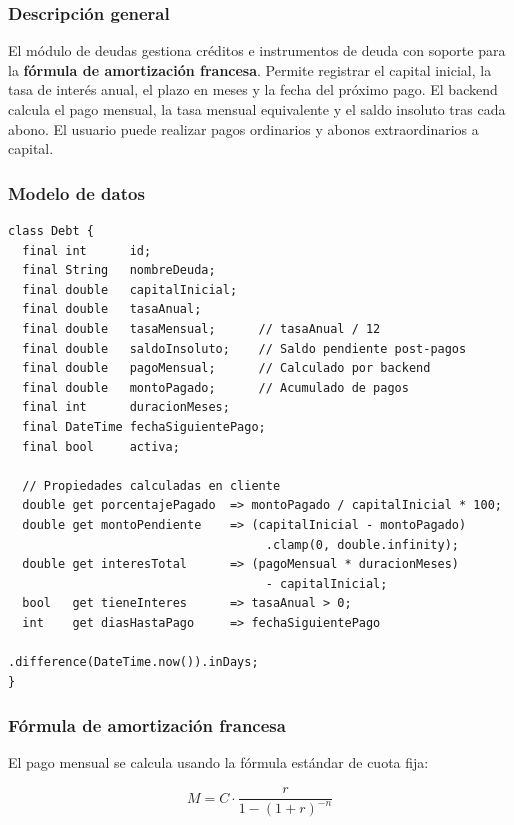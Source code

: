 \subsubsection{Descripción general}

El módulo de deudas gestiona créditos e instrumentos de deuda con soporte
para la \textbf{fórmula de amortización francesa}. Permite registrar el
capital inicial, la tasa de interés anual, el plazo en meses y la fecha
del próximo pago. El backend calcula el pago mensual, la tasa mensual
equivalente y el saldo insoluto tras cada abono. El usuario puede realizar
pagos ordinarios y abonos extraordinarios a capital.

\subsubsection{Modelo de datos}

\begin{lstlisting}[style=dart,
    caption={Modelo de datos Debt en Flutter}]
class Debt {
  final int      id;
  final String   nombreDeuda;
  final double   capitalInicial;
  final double   tasaAnual;
  final double   tasaMensual;      // tasaAnual / 12
  final double   saldoInsoluto;    // Saldo pendiente post-pagos
  final double   pagoMensual;      // Calculado por backend
  final double   montoPagado;      // Acumulado de pagos
  final int      duracionMeses;
  final DateTime fechaSiguientePago;
  final bool     activa;

  // Propiedades calculadas en cliente
  double get porcentajePagado  => montoPagado / capitalInicial * 100;
  double get montoPendiente    => (capitalInicial - montoPagado)
                                    .clamp(0, double.infinity);
  double get interesTotal      => (pagoMensual * duracionMeses)
                                    - capitalInicial;
  bool   get tieneInteres      => tasaAnual > 0;
  int    get diasHastaPago     => fechaSiguientePago
                                    .difference(DateTime.now()).inDays;
}
\end{lstlisting}

\subsubsection{Fórmula de amortización francesa}

El pago mensual se calcula usando la fórmula estándar de cuota fija:

\[
  M = C \cdot \frac{r}{1 - (1 + r)^{-n}}
\]

